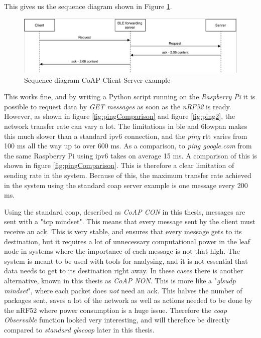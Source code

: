 This gives us the sequence diagram shown in Figure \ref{fig:seq1}. 

\begin{figure}[ht]
    \centering
    \includegraphics[scale=0.27]{seq1.png}    
    \caption{Sequence diagram CoAP Client-Server example}
    \label{fig:seq1}
\end{figure}


This works fine, and by writing a Python script running on the \textit{Raspberry Pi} it is possible to request data by \textit{GET messages} as soon as the \textit{nRF52} is ready. However, as shown in figure \ref{fig:pingComparison} and figure \ref{fig:ping2}, the network transfer rate can vary a lot. The limitations in \gls{ble} and \gls{6lowpan} makes this much slower than a standard \gls{ipv6} connection, and the \textit{ping} \gls{rtt} varies from 100 ms all the way up to over 600 ms. As a comparison, to \textit{ping google.com} from the same Raspberry Pi using \gls{ipv6} takes on average 15 ms. A comparison of this is shown in figure \ref{fig:pingComparison}. This is therefore a clear limitation of sending rate in the system. Because of this, the maximum transfer rate achieved in the system using the standard \gls{coap} server example is one message every 200 ms. 

Using the standard \gls{coap}, described as \textit{CoAP CON} in this thesis, messages are sent with a "\gls{tcp} mindset". This means that every message sent by the client must receive an \gls {ack}. This is very stable, and ensures that every message gets to its destination, but it requires a lot of unnecessary computational power in the leaf node in systems where the importance of each message is not that high. The system is meant to be used with tools for analysing, and it is not essential that data needs to get to its destination right away. In these cases there is another alternative, known in this thesis as \textit{CoAP NON}. This is more like a "\textit{gls{udp} mindset}", where each packet does \textit{not} need an \gls{ack}. This halves the number of packages sent, saves a lot of the network as well as actions needed to be done by the nRF52 where power consumption is a huge issue. Therefore the \textit{\gls{coap} Observable} function looked very interesting, and will therefore be directly compared to \textit{standard gls{coap}} later in this thesis.   

